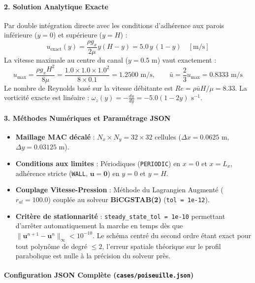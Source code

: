 \documentclass[
  10pt,
]{article}
\providecommand{\tightlist}{%
  \setlength{\itemsep}{0pt}\setlength{\parskip}{0pt}}
\begin{document}
\paragraph{2. Solution Analytique
Exacte}\label{solution-analytique-exacte}

Par double intégration directe avec les conditions d'adhérence aux
parois inférieure (\(y=0\)) et supérieure (\(y=H\)) :
\[u_{\text{exact}}(y) = \frac{\rho g_x}{2\mu} y (H - y) = 5.0 \, y \, (1 - y) \quad [\text{m/s}]\]
La vitesse maximale au centre du canal (\(y = 0.5\text{ m}\)) vaut
exactement :
\[u_{\max} = \frac{\rho g_x H^2}{8\mu} = \frac{1.0 \times 1.0 \times 1.0^2}{8 \times 0.1} = 1.2500\text{ m/s}, \qquad \bar{u} = \frac{2}{3} u_{\max} = 0.8333\text{ m/s}\]
Le nombre de Reynolds basé sur la vitesse débitante est
\(Re = \rho \bar{u} H / \mu = 8.33\). La vorticité exacte est linéaire :
\(\omega_z(y) = -\frac{du}{dy} = -5.0(1 - 2y)\text{ s}^{-1}\).

\paragraph{3. Méthodes Numériques et Paramétrage
JSON}\label{muxe9thodes-numuxe9riques-et-paramuxe9trage-json}

\begin{itemize}
\tightlist
\item
  \textbf{Maillage MAC décalé} : \(N_x \times N_y = 32 \times 32\)
  cellules (\(\Delta x = 0.0625\text{ m}\),
  \(\Delta y = 0.03125\text{ m}\)).
\item
  \textbf{Conditions aux limites} : Périodiques (\texttt{PERIODIC}) en
  \(x=0\) et \(x=L_x\), adhérence stricte (\texttt{WALL},
  \(\mathbf{u}=\mathbf{0}\)) en \(y=0\) et \(y=H\).
\item
  \textbf{Couplage Vitesse-Pression} : Méthode du Lagrangien Augmenté
  (\(r_{al} = 100.0\)) couplée au solveur \textbf{BiCGSTAB(2)}
  (\texttt{tol\ =\ 1e-12}).
\item
  \textbf{Critère de stationnarité} :
  \texttt{steady\_state\_tol\ =\ 1e-10} permettant d'arrêter
  automatiquement la marche en temps dès que
  \(\|\mathbf{u}^{n+1} - \mathbf{u}^n\|_\infty < 10^{-10}\). Le schéma
  centré du second ordre étant exact pour tout polynôme de degré
  \(\le 2\), l'erreur spatiale théorique sur le profil parabolique est
  nulle à la précision du solveur près.
\end{itemize}

\paragraph{\texorpdfstring{Configuration JSON Complète
(\texttt{cases/poiseuille.json})}{Configuration JSON Complète (cases/poiseuille.json)}}\label{configuration-json-compluxe8te-casespoiseuille.json}
\end{document}
